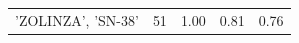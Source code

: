 \begin{center}
\begin{longtable}{@{}lcccc@{}}
    'ZOLINZA', 'SN-38' & 51 & 1.00 & 0.81 & 0.76 \\
\end{longtable}
\end{center}

\newpage %


